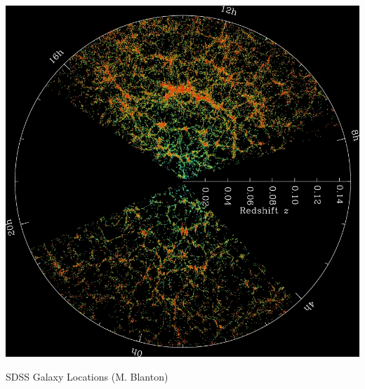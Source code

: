 \documentclass{beamer}
\begin{document}
\frame
{
    \begin{center}
        \includegraphics[height=0.9\textheight]{orangepie.jpg}
    \end{center}
    {\normalsize SDSS Galaxy Locations (M. Blanton)}
}
\end{document}

